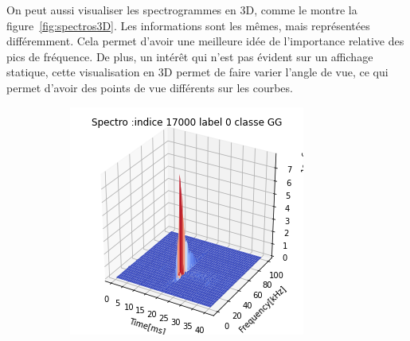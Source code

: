 On peut aussi visualiser les spectrogrammes en 3D, comme le montre la figure~\ref{fig:spectros3D}.
Les informations sont les mêmes, mais représentées différemment.
Cela permet d'avoir une meilleure idée de l'importance relative des pics de fréquence.
De plus, un intérêt qui n'est pas évident sur un affichage statique, cette visualisation en 3D permet de faire varier l'angle de vue, ce qui permet d'avoir des points de vue différents sur les courbes.

\begin{figure}[!h]
  \centering
  \begin{subfigure}[b]{0.3\textwidth}
    \includegraphics[width=\textwidth]{./images/indice17000Spectro3Dlabel0classeGGsansprocessingsanszoom.png}
        \caption{}
  \end{subfigure}
  \begin{subfigure}[b]{0.3\textwidth}

\end{subfigure}
\end{figure}
